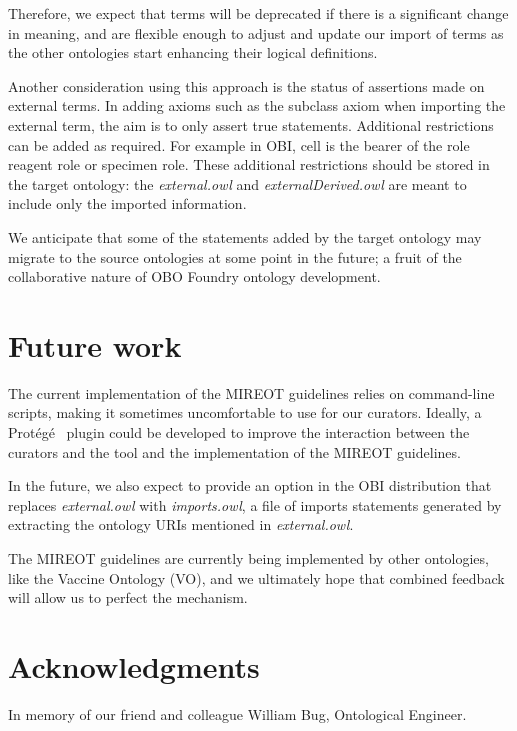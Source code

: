 \documentclass[a4paper,10pt,twocolumn]{article}
\newcommand{\protege}{Prot\'{e}g\'{e}}
\begin{document}
Therefore, we expect that terms will be deprecated if there is a significant change in meaning, and are flexible enough to adjust and update our import of terms as the other ontologies start enhancing their logical definitions.

Another consideration using this approach is the status of assertions made on external terms.
In adding axioms such as the subclass axiom when importing the external term, the aim is to only assert true statements.
Additional restrictions can be added as required.
For example in OBI, cell is the bearer of the role reagent role or specimen role. 
These additional restrictions should be stored in the target ontology: the \emph{external.owl} and \emph{externalDerived.owl} are meant to include only the imported information.

We anticipate that some of the statements added by the target ontology may migrate to the source ontologies at some point in the future; a fruit of the collaborative nature of OBO Foundry ontology development. 


\section*{Future work}

The current implementation of the \ac{MIREOT} guidelines relies on command-line scripts, making it sometimes uncomfortable to use for our curators.
Ideally, a \protege\ \cite{RefWorks:1501} plugin could be developed to improve the interaction between the curators and the tool and the implementation of the MIREOT guidelines.

In the future, we also expect to provide an option in the OBI distribution that replaces \emph{external.owl} with \emph{imports.owl}, a file of imports statements generated by extracting the ontology URIs mentioned in \emph{external.owl}.

The MIREOT guidelines are currently being implemented by other ontologies, like the Vaccine Ontology (VO)\cite{VO}, and we ultimately hope that combined feedback will allow us to perfect the mechanism.

\section*{Acknowledgments}

In memory of our friend and colleague William Bug, Ontological Engineer. 
\end{document}
